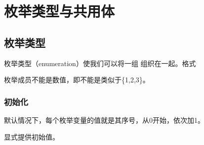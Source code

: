 \documentclass[letterpaper,10pt,english]{sphinxmanual}
\begin{document}
\section{枚举类型与共用体}
\label{\detokenize{cpp/17_enumUnion::doc}}\label{\detokenize{cpp/17_enumUnion:id1}}

\subsection{枚举类型}
\label{\detokenize{cpp/17_enumUnion:id2}}
枚举类型（enumeration）使我们可以将一组  组织在一起。格式

%
\begin{sphinxVerbatim}[commandchars=\\\{\}]
  
\end{sphinxVerbatim}

枚举成员不能是数值，即不能是类似于\{1,2,3\}。


\subsubsection{初始化}
\label{\detokenize{cpp/17_enumUnion:id3}}
默认情况下，每个枚举变量的值就是其序号，从0开始，依次加1。

%
\begin{sphinxVerbatim}[commandchars=\\\{\}]
        
\end{sphinxVerbatim}

显式提供初始值。

%
\begin{sphinxVerbatim}[commandchars=\\\{\}]
        
\end{sphinxVerbatim}
\end{document}
